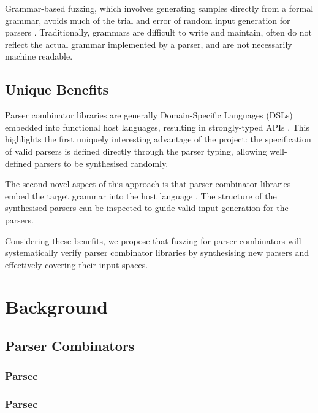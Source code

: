 \documentclass{article}
\begin{document}
Grammar-based fuzzing, which involves generating samples directly from a formal grammar, avoids much of the trial and error of random input generation for parsers \cite{grammar}. Traditionally, grammars are difficult to write and maintain, often do not reflect the actual grammar implemented by a parser, and are not necessarily machine readable.

\subsection{Unique Benefits}
Parser combinator libraries are generally Domain-Specific Languages (DSLs) embedded into functional host languages, resulting in strongly-typed APIs \cite{monadic-combinators, parsec}. This highlights the first uniquely interesting advantage of the project: the specification of valid parsers is defined directly through the parser typing, allowing well-defined parsers to be synthesised randomly.

The second novel aspect of this approach is that parser combinator libraries embed the target grammar into the host language \cite{combinator-parsing}. The structure of the synthesised parsers can be inspected to guide valid input generation for the parsers.

Considering these benefits, we propose that fuzzing for parser combinators will systematically verify parser combinator libraries by synthesising new parsers and effectively covering their input spaces.

\section{Background} %

\subsection{Parser Combinators}
\subsubsection{Parsec}
\subsubsection{Parsec}
\end{document}
